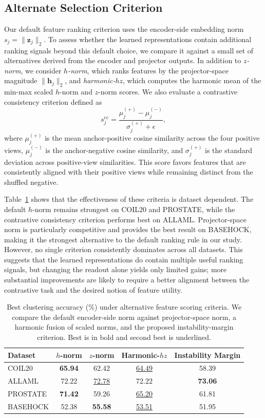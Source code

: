 \documentclass[sigconf,natbib=true,anonymous=true]{acmart}
\begin{document}
\subsection{Alternate Selection Criterion}
Our default feature ranking criterion uses the encoder-side embedding norm
$s_j=\|\mathbf{z}_j\|_2$. To assess whether the learned representations contain
additional ranking signals beyond this default choice, we compare it against a
small set of alternatives derived from the encoder and projector outputs. In
addition to \emph{$z$-norm}, we consider \emph{$h$-norm}, which ranks features by
the projector-space magnitude $\|\mathbf{h}_j\|_2$, and \emph{harmonic-$hz$},
which computes the harmonic mean of the min-max scaled $h$-norm and $z$-norm
scores. We also evaluate a contrastive consistency criterion defined as
\[
s_j^{\mathrm{cc}}
=
\frac{\mu_j^{(+)}-\mu_j^{(-)}}{\sigma_j^{(+)}+\epsilon},
\]
where $\mu_j^{(+)}$ is the mean anchor-positive cosine similarity across the
four positive views, $\mu_j^{(-)}$ is the anchor-negative cosine similarity, and
$\sigma_j^{(+)}$ is the standard deviation across positive-view similarities.
This score favors features that are consistently aligned with their positive
views while remaining distinct from the shuffled negative.

Table~\ref{tab:alt-score} shows that the effectiveness of these criteria is
dataset dependent. The default $h$-norm remains strongest on COIL20 and
PROSTATE, while the contrastive consistency criterion performs best on ALLAML.
Projector-space norm is particularly competitive and provides the best result on
BASEHOCK, making it the strongest alternative to the default ranking rule in our
study. However, no single criterion consistently dominates across all datasets.
This suggests that the learned representations do contain multiple useful
ranking signals, but changing the readout alone yields only limited gains; more
substantial improvements are likely to require a better alignment between the
contrastive task and the desired notion of feature utility.
\begin{table}[h]
  \caption{Best clustering accuracy (\%) under alternative feature scoring criteria. We compare the default encoder-side norm against projector-space norm, a harmonic fusion of scaled norms, and the proposed instability-margin criterion. Best is in bold and second best is underlined.}
  \label{tab:alt-score}
  \centering
  \begin{tabular}{lcccc}
    \toprule
    Dataset & $h$-norm & $z$-norm & Harmonic-$hz$ & Instability Margin \\
    \midrule
    COIL20   & \textbf{65.94} & 62.42 & \underline{64.49} & 58.39 \\
    ALLAML   & 72.22 & \underline{72.78} & 72.22 & \textbf{73.06} \\
    PROSTATE & \textbf{71.42} & 59.26 & \underline{65.20} & 61.81 \\
    BASEHOCK & 52.38 & \textbf{55.58} & \underline{53.51} & 51.95 \\
    \bottomrule
  \end{tabular}
\end{table}
\end{document}
